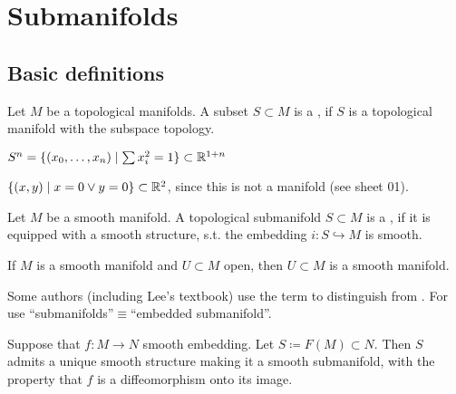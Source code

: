 \chapter{Submanifolds}
\section{Basic definitions}

\begin{definition*}
    Let \(M\) be a topological manifolds. A subset \(S\subset M\) is a ,
    if \(S\) is a topological manifold with the subspace topology.
\end{definition*}

\begin{example}
    \(S^n=\{(x_0,\dots,x_n)\mid \sum x_i^2=1\}\subset\mathbb{R}^{1+n}\)
\end{example}
\begin{example}
    \(\{(x,y)\mid x=0\lor y=0\}\subset\mathbb{R}^2\), since this is not a manifold (see sheet 01).
\end{example}
\begin{definition*}
    Let \(M\) be a smooth manifold. A topological submanifold \(S\subset M\) is a , if 
    it is equipped with a smooth structure, s.t. the embedding \(i:S\hookrightarrow M\) is smooth.   
\end{definition*}

\begin{example}
    If \(M\) is a smooth manifold and \(U\subset M\) open, then \(U\subset M\) is a smooth manifold.
\end{example}

\begin{remark}
    Some authors (including Lee's textbook) use the term  to distinguish 
    from . For use ``submanifolds''\(\equiv\)``embedded submanifold''.
\end{remark}  

\begin{lemma}\label{lem:5.1}
    Suppose that \(f:M\to N\) smooth embedding. Let \(S\coloneqq F(M)\subset N\). Then 
    \(S\) admits a unique smooth structure making it a smooth submanifold, with the property that 
    \(f\) is a diffeomorphism onto its image.
\end{lemma}

